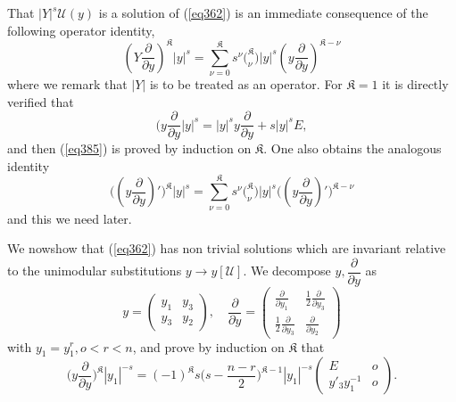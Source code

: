 That $| Y |^s \mathcal{U} (y)$ is a solution of (\ref{eq362}) is an
 immediate consequence of the following operator identity, 
 \begin{equation*} 
(Y \frac{\partial}{\partial y} )^\mathfrak{K} |y |^s =
   \sum^{\mathfrak{K}}_{\nu = 0} s^\nu \big( ^{\mathfrak{K}}_{\nu} \big)
   | y |^s (y \frac{\partial}{\partial y})^{\mathfrak{K} - \nu}
   \tag{385}\label{eq385} 
 \end{equation*} 
 where we remark that $| Y |$ is to be treated as an operator. For
 $\mathfrak{K} = 1$ it is directly verified that 
 $$
 (y \frac{\partial}{\partial y} | y |^s = | y |^s y
 \frac{\partial}{\partial y} + s | y |^s E, 
 $$
 and then (\ref{eq385}) is proved by induction on $\mathfrak{K}$. One also
 obtains the analogous identity 
 \begin{equation*}
\big( (y \frac{\partial}{\partial y})' \big)^\mathfrak{K} | y |^s =
\sum^{\mathfrak{K}}_{\nu = 0} s^\nu \big(^\mathfrak{K}_\nu \big) | y |^s
\big( (y \frac{\partial}{\partial y})' \big)^{\mathfrak{K} - \nu}
\tag{386}\label{eq386} 
 \end{equation*} 
 and this we need later.

We now\pageoriginale show that (\ref{eq362}) has non trivial solutions
which are invariant relative to the unimodular substitutions $y \to y
[\mathcal{U}]$. We decompose $y, \dfrac{\partial}{\partial y}$ as   
$$
y =  
\begin{pmatrix}
y_1 & y_3 \\
y_3 & y_2
\end{pmatrix},
\quad \frac{\partial}{\partial y} =
\begin{pmatrix}
\frac{\partial}{\partial y_1} & \frac{1}{2} \frac{\partial}{\partial y_3}\\
\frac{1}{2} \frac{\partial}{\partial y_3} & \frac{\partial}{\partial y_2}
\end{pmatrix}
$$
with $y_1 = y_1^r, o < r < n$, and prove by induction on $\mathfrak{K}$
that  
\begin{equation*}
\big( y \frac{\partial}{\partial y} \big)^{\mathfrak{K}} |y _1|^{- s} =
(-1)^\mathfrak{K} s \big (s - \frac{n - r}{2} \big)^{\mathfrak{K} - 1} |
y_1 |^{- s} 
\begin{pmatrix} 
E & o\\ 
y'_3 y^{-1}_1 &  o 
\end{pmatrix}. \tag{387}\label{eq387} 
\end{equation*}

